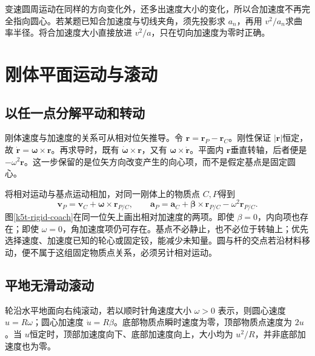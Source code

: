 变速圆周运动在同样的方向变化外，还多出速度大小的变化，所以合加速度不再完全指向圆心。若某题已知合加速度与切线夹角，须先投影求 $a_n$，再用 $v^2/a_n$求曲率半径。将合加速度大小直接放进 $v^2/a$，只在切向加速度为零时正确。

\section{刚体平面运动与滚动}
\subsection{以任一点分解平动和转动}
刚体速度与加速度的关系可从相对位矢推导。令 $\bm r=\bm r_P-\bm r_C$。刚性保证 $|\bm r|$恒定，故 $\dot{\bm r}=\bm\omega\times\bm r$。再求导时，既有 $\dot{\bm\omega}\times\bm r$，又有 $\bm\omega\times\dot{\bm r}$。平面内 $\bm r$垂直转轴，后者便是 $-\omega^2\bm r$。这一步保留的是位矢方向改变产生的向心项，而不是假定基点是固定圆心。

将相对运动与基点运动相加，对同一刚体上的物质点 $C,P$得到
\[\bm v_P=\bm v_C+\bm\omega\times\bm r_{P/C},\qquad
\bm a_P=\bm a_C+\bm\beta\times\bm r_{P/C}-\omega^2\bm r_{P/C}.\]
图\ref{k5t-rigid-coach}在同一位矢上画出相对加速度的两项。即使 $\beta=0$，内向项也存在；即使 $\omega=0$，角加速度项仍可存在。基点不必静止，也不必位于转轴上；优先选择速度、加速度已知的轮心或固定铰，能减少未知量。圆与杆的交点若沿材料移动，便不属于这组固定物质点关系，必须另计相对运动。

\subsection{平地无滑动滚动}
轮沿水平地面向右纯滚动，若以顺时针角速度大小 $\omega>0$ 表示，则圆心速度 $u=R\omega$；圆心加速度 $\dot u=R\beta$。底部物质点瞬时速度为零，顶部物质点速度为 $2u$。当 $u$恒定时，顶部加速度向下、底部加速度向上，大小均为 $u^2/R$，并非底部加速度也为零。

